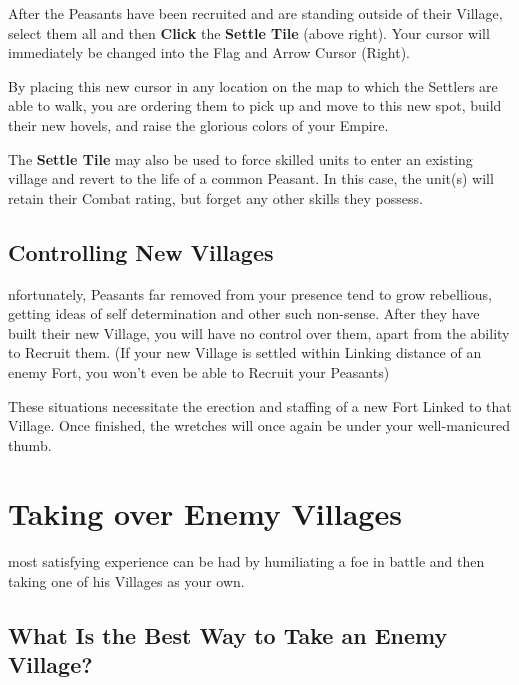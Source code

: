 
After the Peasants have been recruited and are standing outside of their Village, select them all and then \textbf{Click} the \textbf{Settle Tile} (above right). Your cursor will immediately be changed into the Flag and Arrow Cursor (Right).

By placing this new cursor in any location on the map to which the Settlers are able to walk, you are ordering them to pick up and move to this new spot, build their new hovels, and raise the glorious colors of your Empire.


The \textbf{Settle Tile} may also be used to force skilled units to enter an existing village and revert to the life of a common Peasant. In this case, the unit(s) will retain their Combat rating, but forget any other skills they possess.

\subsection{\textsf{Controlling New Villages}}



nfortunately, Peasants far removed from your presence tend to grow rebellious, getting ideas of self determination and other such non-sense. After they have built their new Village, you will have no control over them, apart from the ability to Recruit them. (If your new Village is settled within Linking distance of an enemy Fort, you won’t even be able to Recruit your Peasants)


These situations necessitate the erection and staffing of a new Fort Linked to that Village. Once finished, the wretches will once again be under your well-manicured thumb.

\section{\textsf{Taking over Enemy Villages}}


 most satisfying experience can be had by humiliating a foe in battle and then taking one of his Villages as your own.

\subsection{\textsf{What Is the Best Way to Take an Enemy Village?}}


